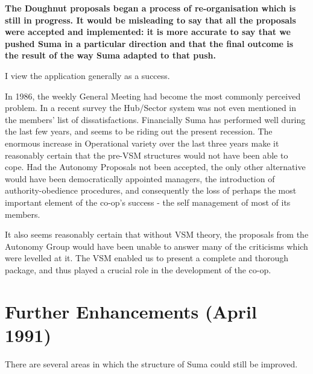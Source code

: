 \textbf{The Doughnut proposals began a process of re-organisation which is still in progress. It would be misleading to say that all the proposals were accepted and implemented: it is more accurate to say that we pushed Suma in a particular direction and that the final outcome is the result of the way Suma adapted to that push.}

I view the application generally as a success.

In 1986, the weekly General Meeting had become the most commonly perceived problem. In a recent survey the Hub/Sector system was not even mentioned in the members' list of dissatisfactions. Financially Suma has performed well during the last few years, and seems to be riding out the present recession. The enormous increase in Operational variety over the last three years make it reasonably certain that the pre-VSM structures would not have been able to cope. Had the Autonomy Proposals not been accepted, the only other alternative would have been democratically appointed managers, the introduction of authority-obedience procedures, and consequently the loss of perhaps the most important element of the co-op's success - the self management of most of its members.

It also seems reasonably certain that without VSM theory, the proposals from the Autonomy Group would have been unable to answer many of the criticisms which were levelled at it. The VSM enabled us to present a complete and thorough package, and thus played a crucial role in the development of the co-op.

\section*{Further Enhancements (April 1991)}
There are several areas in which the structure of Suma could still be improved.

